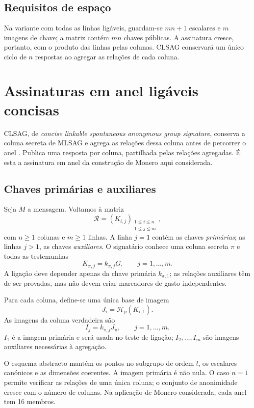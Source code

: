 \subsection*{Requisitos de espaço}

Na variante com todas as linhas ligáveis, guardam-se \(mn+1\) escalares e
\(m\) imagens de chave; a matriz contém \(mn\) chaves públicas. A assinatura
cresce, portanto, com o produto das linhas pelas colunas. CLSAG conservará um
único ciclo de \(n\) respostas ao agregar as relações de cada coluna.

\section{Assinaturas em anel ligáveis concisas}
\label{sec:CLSAG}

CLSAG, de \emph{concise linkable spontaneous anonymous group signature},
conserva a coluna secreta de MLSAG e agrega as relações dessa coluna antes
de percorrer o anel \cite{MRL-0011-CLSAG}. Publica uma resposta por coluna,
partilhada pelas relações agregadas. É esta a assinatura em anel da
construção de Monero aqui considerada.

\subsection*{Chaves primárias e auxiliares}

Seja \(M\) a mensagem. Voltamos à matriz
\[
\mathcal R=(K_{i,j})_
 {\substack{1\leq i\leq n\\1\leq j\leq m}},
\]
com \(n\geq1\) colunas e \(m\geq1\) linhas. A linha \(j=1\) contém as chaves
\emph{primárias}; as linhas \(j>1\), as chaves \emph{auxiliares}. O
signatário conhece uma coluna secreta \(\pi\) e todas as testemunhas
\[
K_{\pi,j}=k_{\pi,j}G,\qquad j=1,\ldots,m.
\]
A ligação deve depender apenas da chave primária \(k_{\pi,1}\); as relações
auxiliares têm de ser provadas, mas não devem criar marcadores de gasto
independentes.

Para cada coluna, define-se uma única base de imagem
\[
J_i=\mathcal H_p(K_{i,1}).
\]
As imagens da coluna verdadeira são
\[
I_j=k_{\pi,j}J_\pi,\qquad j=1,\ldots,m.
\]
\(I_1\) é a imagem primária e será usada no teste de ligação; \(I_2,\ldots,I_m\)
são imagens auxiliares necessárias à agregação.

O esquema abstracto mantém os pontos no subgrupo de ordem \(l\), os
escalares canónicos e as dimensões coerentes. A imagem primária é não nula.
O caso \(n=1\) permite verificar as relações de uma única coluna; o conjunto
de anonimidade cresce com o número de colunas. Na aplicação de Monero
considerada, cada anel tem 16 membros.

